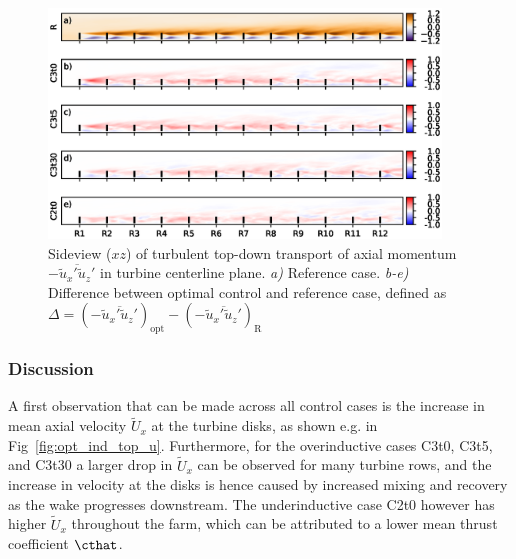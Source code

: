 	\begin{figure}[bt]
		\centering
		\includegraphics[width=0.93\textwidth]{chapters/optimal_induction_control/sideview_uw.eps}
		\caption{Sideview ($xz$) of turbulent top-down transport of axial momentum $- \overline{\widetilde{u}_x'\widetilde{u}_z'}$ in turbine centerline plane. \emph{a) } Reference case. \emph{b-e)} Difference between optimal control and reference case, defined as $\Delta = (- \overline{\widetilde{u}_x'\widetilde{u}_z'})_{\text{opt}} - (- \overline{\widetilde{u}_x'\widetilde{u}_z'})_{\text{R}}$  \label{fig:opt_ind_side_uw}}
	\end{figure}	

	\subsubsection{Discussion}
	 A first observation that can be made across all control cases is the increase in mean axial velocity $\widetilde{U}_x$ at the turbine disks, as shown e.g. in Fig~\ref{fig:opt_ind_top_u}. Furthermore, for the overinductive cases C3t0, C3t5, and C3t30 a larger drop in $\widetilde{U}_x$ can be observed for many turbine rows, and the increase in velocity at the disks is hence caused by increased mixing and recovery as the wake progresses downstream. The underinductive case C2t0 however has higher $\widetilde{U}_x$ throughout the farm, which can be attributed to a lower mean thrust coefficient $\cthat$. 
	 
